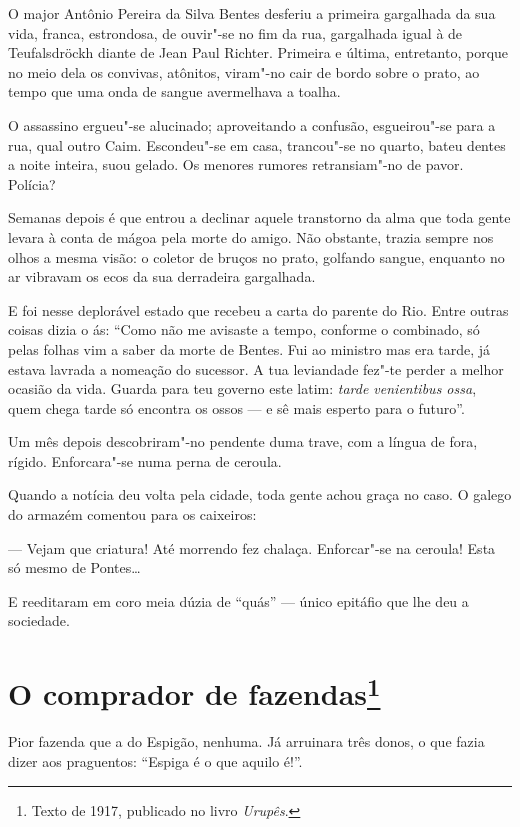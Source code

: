 O major Antônio Pereira da Silva Bentes desferiu a primeira gargalhada
da sua vida, franca, estrondosa, de ouvir"-se no fim da rua, gargalhada
igual à de Teufalsdröckh diante de Jean Paul Richter. Primeira e última,
entretanto, porque no meio dela os convivas, atônitos, viram"-no cair de
bordo sobre o prato, ao tempo que uma onda de sangue avermelhava a
toalha.

O assassino ergueu"-se alucinado; aproveitando a confusão, esgueirou"-se
para a rua, qual outro Caim. Escondeu"-se em casa, trancou"-se no quarto,
bateu dentes a noite inteira, suou gelado. Os menores rumores
retransiam"-no de pavor. Polícia?

Semanas depois é que entrou a declinar aquele transtorno da alma que
toda gente levara à conta de mágoa pela morte do amigo. Não obstante,
trazia sempre nos olhos a mesma visão: o coletor de bruços no prato,
golfando sangue, enquanto no ar vibravam os ecos da sua derradeira
gargalhada.

E foi nesse deplorável estado que recebeu a carta do parente do Rio.
Entre outras coisas dizia o ás: ``Como não me avisaste a tempo, conforme
o combinado, só pelas folhas vim a saber da morte de Bentes. Fui ao
ministro mas era tarde, já estava lavrada a nomeação do sucessor. A tua
leviandade fez"-te perder a melhor ocasião da vida. Guarda para teu
governo este latim: \emph{tarde venientibus ossa}, quem chega tarde só
encontra os ossos --- e sê mais esperto para o futuro''.

Um mês depois descobriram"-no pendente duma trave, com a língua de fora,
rígido. Enforcara"-se numa perna de ceroula.

Quando a notícia deu volta pela cidade, toda gente achou graça no caso.
O galego do armazém comentou para os caixeiros:

--- Vejam que criatura! Até morrendo fez chalaça. Enforcar"-se na
ceroula! Esta só mesmo de Pontes\ldots{}

E reeditaram em coro meia dúzia de ``quás'' --- único epitáfio que lhe
deu a sociedade.

\chapter{O comprador de fazendas\footnote[*]{Texto de 1917, publicado no livro \emph{Urupês}.}}

Pior fazenda que a do Espigão, nenhuma. Já arruinara três donos, o que
fazia dizer aos praguentos: ``Espiga é o que aquilo é!''.

